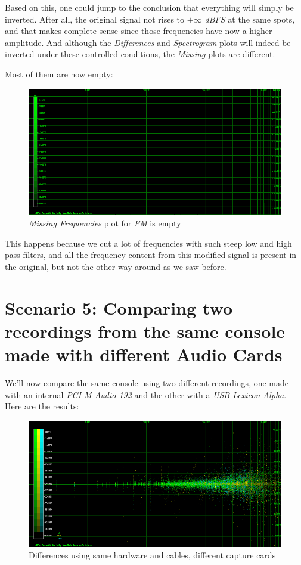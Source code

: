 \documentclass[10pt,a4paper]{report}
\begin{document}
Based on this, one could jump to the conclusion that everything will simply be inverted. After all, the original signal not rises to \textit{$+\infty$ dBFS} at the same spots, and that makes complete sense since those frequencies have now a higher amplitude. And although the \textit{Differences} and \textit{Spectrogram} plots will indeed be inverted under these controlled conditions, the \textit{Missing} plots are different.

Most of them are now empty:

\begin{figure}[H]
	\centering
	\includegraphics[width=1.0\linewidth]{plots/Plot4-8-Missing-FM-Inverted}
	\caption[Reversed FM Missing]{\textit{Missing Frequencies} plot for \textit{FM} is empty}
	\label{fig:plot4-8-missing-fm-inverted}
\end{figure}

This happens because we cut a lot of frequencies with such steep low and high pass filters, and all the frequency content from this modified signal is present in the original, but not the other way around as we saw before.

\section{Scenario 5: Comparing two recordings from the same console made with different Audio Cards}

We'll now compare the same console using two different recordings, one made with an internal \textit{PCI M-Audio 192} and the other with a \textit{USB Lexicon Alpha}. Here are the results:

\begin{figure}[H]
	\centering
	\includegraphics[width=1.0\linewidth]{plots/Plot5-1-All}
	\caption[Reversed FM Missing]{Differences using same hardware and cables, different capture cards}
	\label{fig:plot5-1-all}
\end{figure}
\end{document}
